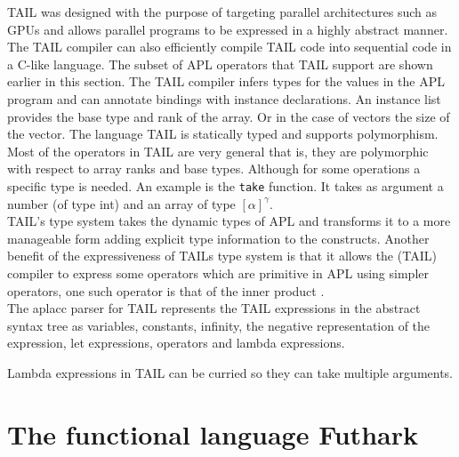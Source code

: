 \documentclass[11pt]{article}
\begin{document}
TAIL was designed with the purpose of targeting parallel architectures such as GPUs and allows parallel programs to be
expressed in a highly abstract manner.
The TAIL compiler can also efficiently compile TAIL code into sequential code in a C-like language.
The subset of APL operators that TAIL support are shown earlier in this section.
The TAIL compiler infers types for the values in the APL program and can annotate bindings with
instance declarations. An instance list provides the base type and rank of the array. Or in
the case of vectors the size of the vector.
The language TAIL is statically typed and supports polymorphism. 
Most of the operators in TAIL are very general that is, they are polymorphic with respect to array ranks and base types.
Although for some operations a specific type is needed.
An example is the {\tt take} function. It takes as argument a number (of type int) and an array of type $[\alpha]^\gamma$.\\

TAIL's type system takes the dynamic types of APL and transforms it to a more manageable form adding explicit type
information to the constructs.
Another benefit of the expressiveness of TAILs type system is that it allows the (TAIL) compiler to express some operators which
are primitive in APL using simpler operators, one such operator is that of the inner product \cite{ElsmanDybdal:Array:2014}. \\

The aplacc parser for TAIL represents the TAIL expressions in the abstract syntax tree as variables, constants, infinity, the negative representation of 
the expression, let expressions, operators and lambda expressions. 


Lambda expressions in TAIL can be curried so they can take multiple arguments.




\section{The functional language Futhark}
\label{sec:futhark}
\end{document}
